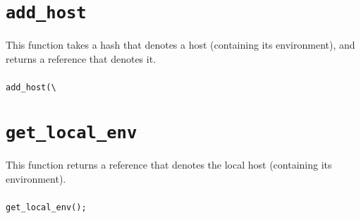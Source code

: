 \documentclass[a4paper,10pt]{report}
\def\|{\verb|} %|
\begin{document}
\section{\texttt{add\_host}}

This function takes a hash that denotes a host (containing its
environment), and returns a reference that denotes it.

\subsubsection{\format}

\begin{boxnote}
\begin{alltt}
add_host(\|\|%\textit{env});
\end{alltt}
\end{boxnote}

\subsubsection{\example}


\section{\texttt{get\_local\_env}}

This function returns a reference that denotes the local host
(containing its environment).

\subsubsection{\format}

\begin{boxnote}
\begin{alltt}
get_local_env();
\end{alltt}
\end{boxnote}

\subsubsection{\example}
\end{document}
